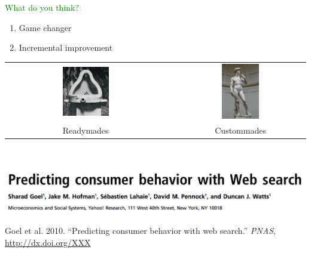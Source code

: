 \documentclass[aspectratio=169]{beamer}
\def\vf{\vfill}
\begin{document}
\begin{frame}

\textcolor{green}{What do you think?}
\begin{enumerate}
\item Game changer
\item Incremental improvement
\end{enumerate}

\end{frame}
\begin{frame}

\begin{center}
\begin{tabular}{ccc}
\includegraphics[width=0.30\textwidth]{figures/duchamp_fountain} & \phantom{12345} & \includegraphics[width=0.30\textwidth]{figures/michelangelo_david} \\
\LARGE{Readymades} &  & \LARGE{Custommades}
\end{tabular}
\end{center}

\vf
\vspace{0.3in}
\\

\end{frame}
\begin{frame}

\begin{center}
\includegraphics[width=\textwidth]{figures/goel_predicting_2010_title}
\end{center}

\vf
Goel et al. 2010. ``Predicting consumer behavior with web search.'' \textit{PNAS}, \url{http://dx.doi.org/XXX}

\end{frame}
\end{document}
